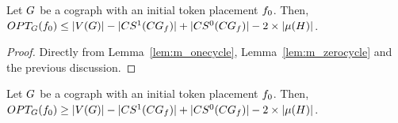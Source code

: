 \documentclass[msc]{ppgccufmg}    %
\begin{document}


\begin{lemma}
\label{lem:ub_cograph}
Let $G$ be a cograph with an initial token placement $f_{0}$.
Then, $OPT_{G}(f_{0}) \leq |V(G)| - 
|CS^{1}(CG_{f})| +
|CS^{0}(CG_{f})| - 2\times|\mu(H)|$.
\end{lemma}

\begin{proof}
Directly from Lemma~\ref{lem:m_onecycle}, Lemma~\ref{lem:m_zerocycle} and the previous discussion.
\end{proof}

\begin{lemma}
\label{lem:lb_cograph}
Let $G$ be a cograph with an initial token placement $f_{0}$.
Then, $OPT_{G}(f_{0}) \geq |V(G)| - 
|CS^{1}(CG_{f})| +
|CS^{0}(CG_{f})| - 2\times|\mu(H)|$.
\end{lemma}
\end{document}
